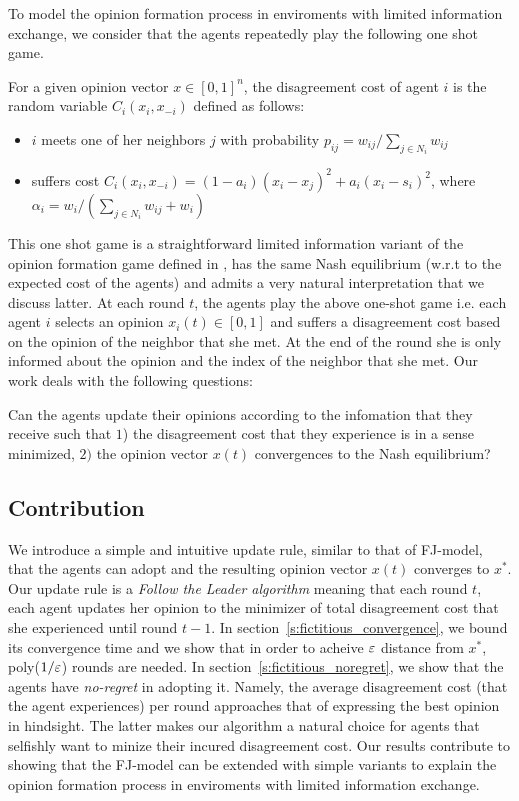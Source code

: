 To model the opinion formation process in enviroments
with limited information exchange, we consider
that the agents repeatedly play the following one shot game.

\begin{definition}\label{d:random_game}
  For a given opinion vector $x \in [0,1]^n$, the disagreement cost of agent $i$
  is the random variable $C_i(x_i,x_{-i})$ defined as follows:
  \begin{itemize}
    \item $i$ meets one of her neighbors $j$ with probability
      $p_{ij}= w_{ij}/\sum_{j\in N_i}w_{ij}$
    \item suffers cost $C_i(x_i , x_{-i}) = (1-a_i)(x_i-x_j)^2 + a_i(x_i-s_i)^2$,
      where $\alpha_i = w_i/(\sum_{j\in N_i}w_{ij}+w_i)$
  \end{itemize}
\end{definition}

This one shot game
is a straightforward limited information variant of the opinion formation game
defined in \cite{BKO11}, has the same Nash equilibrium (w.r.t
to the expected cost of the agents) and admits a very
natural interpretation that we discuss latter.
At each round $t$, the agents play the above one-shot game i.e.
each agent $i$ selects an opinion $x_i(t)\in [0,1]$ and
suffers a disagreement cost based on the opinion of the neighbor
that she met. At the end of the round she is only informed about
the opinion and the index of the neighbor that she met. Our work
deals with the following questions:
\begin{question}
Can the agents update their opinions according to the
infomation that they receive such that
$1$) the disagreement cost that they experience is in a
sense minimized, $2)$ the opinion vector $x(t)$ convergences
to the Nash equilibrium?
\end{question}

\subsection{Contribution}
We introduce a simple and intuitive update rule,
similar to that of FJ-model, that the agents can adopt
and the resulting opinion vector $x(t)$ converges to $x^*$.
Our update rule is a \emph{Follow the Leader algorithm}
meaning that each round $t$, each agent updates her opinion
to the minimizer of total disagreement cost that
she experienced until round $t-1$. In section~\ref{s:fictitious_convergence},
we bound its convergence time and we show that in order
to acheive $\varepsilon$ distance from $x^*$, poly($1/\varepsilon$) rounds
are needed. In section~\ref{s:fictitious_noregret},
we show that the agents have \emph{no-regret} in adopting
it. Namely, the average disagreement cost (that
the agent experiences) per round approaches that
of expressing the best opinion in hindsight. The latter
makes our algorithm a natural choice for agents that
selfishly want to minize their incured disagreement cost.
Our results contribute to showing that the FJ-model
can be extended with simple variants to explain
the opinion formation process in enviroments with limited
information exchange.

